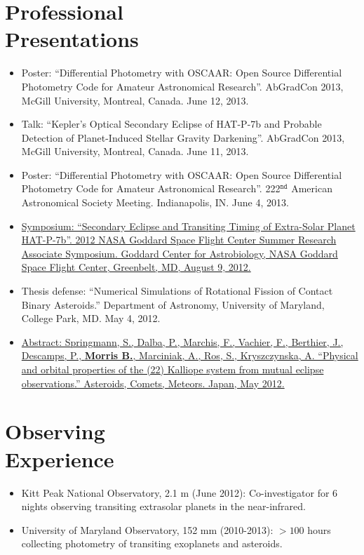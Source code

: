 \documentclass[margin]{res}
\begin{document}
\begin{resume}
\section{Professional\\ Presentations} 
                 \begin{itemize}  %
                 \item Poster: ``Differential Photometry with OSCAAR: Open Source Differential Photometry Code for Amateur Astronomical Research''. AbGradCon 2013, McGill University, Montreal, Canada. June 12, 2013.
                 \item Talk: ``Kepler's Optical Secondary Eclipse of HAT-P-7b and Probable Detection of Planet-Induced Stellar Gravity Darkening''. AbGradCon 2013, McGill University, Montreal, Canada. June 11, 2013.
                 \item Poster: ``Differential Photometry with OSCAAR: Open Source Differential Photometry Code for Amateur Astronomical Research''. 222$^\mathtt{nd}$ American Astronomical Society Meeting. Indianapolis, IN. June 4, 2013.
                 \item \href{https://astrobiology.nasa.gov/seminars/featured-seminar-channels/gsfc-summer-internship/2012/08/09/gsfc-summer-research-associate-presentations/}{Symposium: ``Secondary Eclipse and Transiting Timing of Extra-Solar Planet HAT-P-7b''. 2012 NASA Goddard Space Flight Center Summer Research Associate Symposium. Goddard Center for Astrobiology, NASA Goddard Space Flight Center, Greenbelt, MD, August 9, 2012.}
	        \item Thesis defense:  ``Numerical Simulations of Rotational Fission of Contact Binary Asteroids.'' Department of Astronomy, University of Maryland, College Park, MD. May 4, 2012.
                 \item \href{http://adsabs.harvard.edu/abs/2012LPICo1667.6352S}{Abstract: Springmann, S., Dalba, P., Marchis, F., Vachier, F., Berthier, J., Descamps, P., \textbf{Morris B.}, 
		Marciniak, A., Ros, S., Kryszczynska, A. ``Physical and orbital properties of the (22) Kalliope system from mutual eclipse observations.'' 
		Asteroids, Comets, Meteors. Japan, May 2012.}\\
		\end{itemize}

\section{Observing \\Experience}
            \begin{itemize}   
            \item Kitt Peak National Observatory, 2.1 m (June 2012): Co-investigator for 6 nights observing transiting extrasolar planets in the near-infrared.
            \item University of Maryland Observatory, 152 mm (2010-2013): $>100$ hours collecting photometry of transiting exoplanets and asteroids. \\
            \end{itemize}
                 

\end{resume}
\end{document}
